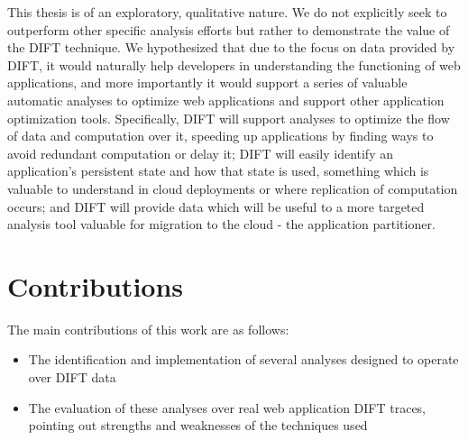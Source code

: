 \documentclass[msc,oneside]{ubcthesis}
\begin{document}
This thesis is of an exploratory, qualitative nature. We do not explicitly seek to outperform other specific analysis efforts but rather to demonstrate the value of the DIFT technique. We hypothesized that due to the focus on data provided by DIFT, it would naturally help developers in understanding the functioning of web applications, and more importantly it would support a series of valuable automatic analyses to optimize web applications and support other application optimization tools. Specifically, DIFT will support analyses to optimize the flow of data and computation over it, speeding up applications by finding ways to avoid redundant computation or delay it; DIFT will easily identify an application's persistent state and how that state is used, something which is valuable to understand in cloud deployments or where replication of computation occurs; and DIFT will provide data which will be useful to a more targeted analysis tool valuable for migration to the cloud - the application partitioner.
	
	

\section{Contributions}
	
The main contributions of this work are as follows: 
\begin{itemize}
\item The identification and implementation of several analyses designed to operate over DIFT data
\item The evaluation of these analyses over real web application DIFT traces, pointing out strengths and weaknesses of the techniques used
\end{itemize}
\end{document}
